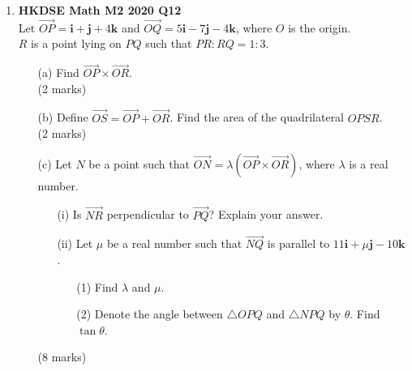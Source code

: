 \documentclass{report}
\begin{document}
\begin{enumerate}
	\item \textbf{HKDSE Math M2 2020 Q12}\\
	Let $\overrightarrow{OP} = \textbf{i} + \textbf{j}+ 4\textbf {k}$ and $\overrightarrow{OQ} = 5\textbf{i} -7 \textbf{j}- 4\textbf {k}$, where $O$ is the origin. \\
	$R$ is a point lying on $PQ$ such that $PR:RQ = 1:3$. 
	\begin{enumerate}
		\item [(a)]Find $\overrightarrow{OP} \times \overrightarrow{OR}$. \\(2 marks)
		\item [(b)]Define $\overrightarrow{OS} = \overrightarrow{OP} + \overrightarrow{OR}$. Find the area of the quadrilateral $OPSR$. \\(2 marks)
		\item [(c)]Let $N$ be a point such that $\overrightarrow{ON} = \lambda(\overrightarrow{OP}\times \overrightarrow{OR})$, where $\lambda$ is a real number.
		\begin{enumerate}
			\item [(i)]Is $\overrightarrow{NR}$ perpendicular to $\overrightarrow{PQ}$? Explain your answer.
			\item [(ii)]Let $\mu$ be a real number such that $\overrightarrow{NQ}$ is parallel to $11\textbf{i} + \mu\textbf{j}-10\textbf {k}$. 
			\begin{enumerate}
				\item [(1)]Find $\lambda$ and $\mu$. 
				\item [(2)]Denote the angle between $\triangle OPQ$ and $\triangle NPQ$ by $\theta$. Find $\tan{\theta}$.
			\end{enumerate}
		\end{enumerate}
		(8 marks)
	\end{enumerate}


\end{enumerate}
\end{document}
